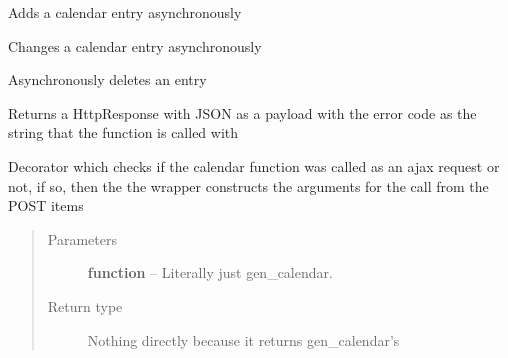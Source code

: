 \documentclass[letterpaper,10pt,english]{sphinxmanual}
\begin{document}
\begin{fulllineitems}
\label{code:timetracker.utils.calendar_utils.ajax_add_entry}
Adds a calendar entry asynchronously

\end{fulllineitems}


\begin{fulllineitems}
\label{code:timetracker.utils.calendar_utils.ajax_change_entry}
Changes a calendar entry asynchronously

\end{fulllineitems}


\begin{fulllineitems}
\label{code:timetracker.utils.calendar_utils.ajax_delete_entry}
Asynchronously deletes an entry

\end{fulllineitems}


\begin{fulllineitems}
\label{code:timetracker.utils.calendar_utils.ajax_error}
Returns a HttpResponse with JSON as a payload with the error
code as the string that the function is called with

\end{fulllineitems}


\begin{fulllineitems}
\label{code:timetracker.utils.calendar_utils.calendar_wrapper}
Decorator which checks if the calendar function was
called as an ajax request or not, if so, then the
the wrapper constructs the arguments for the call
from the POST items
\begin{quote}\begin{description}
\item[{Parameters}] \leavevmode
\textbf{function} -- Literally just gen\_calendar.

\item[{Return type}] \leavevmode
Nothing directly because it returns gen\_calendar's

\end{description}\end{quote}

\end{fulllineitems}
\end{document}
